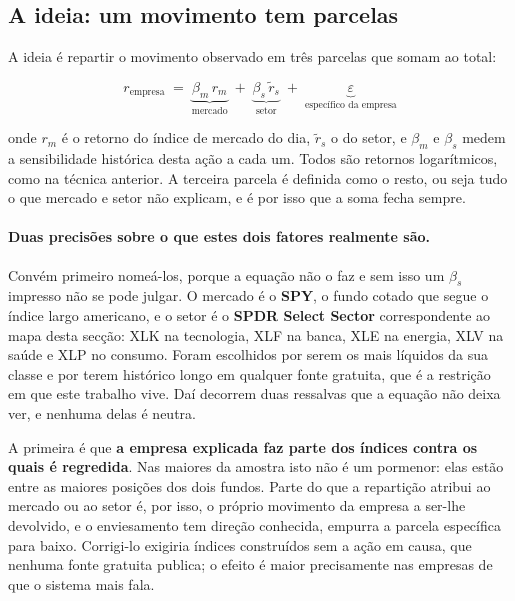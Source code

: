 \subsection{A ideia: um movimento tem parcelas}

A ideia é repartir o movimento observado em três parcelas que somam ao total:

\begin{equation}
r_{\text{empresa}} \;=\; \underbrace{\beta_m \, r_m}_{\text{mercado}}
\;+\; \underbrace{\beta_s \, \tilde r_s}_{\text{setor}}
\;+\; \underbrace{\varepsilon}_{\text{específico da empresa}}
\label{eq:decomposicao}
\end{equation}

onde $r_m$ é o retorno do índice de mercado do dia, $\tilde r_s$ o do setor, e $\beta_m$ e $\beta_s$
medem a sensibilidade histórica desta ação a cada um. Todos são retornos logarítmicos, como na
técnica anterior. A terceira parcela é definida como o resto, ou seja tudo o que mercado e setor
não explicam, e é por isso que a soma fecha sempre.

\paragraph{Duas precisões sobre o que estes dois fatores realmente são.}
Convém primeiro nomeá-los, porque a equação não o faz e sem isso um $\beta_s$ impresso não se pode
julgar. O mercado é o \textbf{SPY}, o fundo cotado que segue o índice largo americano, e o setor é
o \textbf{SPDR Select Sector} correspondente ao mapa desta secção: XLK na tecnologia, XLF na banca,
XLE na energia, XLV na saúde e XLP no consumo. Foram escolhidos por serem os mais líquidos da sua
classe e por terem histórico longo em qualquer fonte gratuita, que é a restrição em que este
trabalho vive. Daí decorrem duas ressalvas que a equação não deixa ver, e nenhuma delas é neutra.

A primeira é que \textbf{a empresa explicada faz parte dos índices contra os quais é regredida}.
Nas maiores da amostra isto não é um pormenor: elas estão entre as maiores posições dos dois
fundos. Parte do que a repartição atribui ao mercado ou ao setor é, por isso, o próprio movimento
da empresa a ser-lhe devolvido, e o enviesamento tem direção conhecida, empurra a parcela
específica para baixo. Corrigi-lo exigiria índices construídos sem a ação em causa, que nenhuma
fonte gratuita publica; o efeito é maior precisamente nas empresas de que o sistema mais fala.

